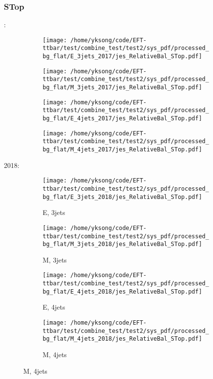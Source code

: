 \documentclass{beamer}
\begin{document}
\begin{frame}
\frametitle{STop}
\fontsize{5}{1}:
\begin{figure}
\centering
\begin{subfigure}[b]{0.24\textwidth}
\texttt{[image: /home/yksong/code/EFT-ttbar/test/combine\_test/test2/sys\_pdf/processed\_bg\_flat/E\_3jets\_2017/jes\_RelativeBal\_STop.pdf]}
\end{subfigure}
\begin{subfigure}[b]{0.24\textwidth}
\texttt{[image: /home/yksong/code/EFT-ttbar/test/combine\_test/test2/sys\_pdf/processed\_bg\_flat/M\_3jets\_2017/jes\_RelativeBal\_STop.pdf]}
\end{subfigure}
\begin{subfigure}[b]{0.24\textwidth}
\texttt{[image: /home/yksong/code/EFT-ttbar/test/combine\_test/test2/sys\_pdf/processed\_bg\_flat/E\_4jets\_2017/jes\_RelativeBal\_STop.pdf]}
\end{subfigure}
\begin{subfigure}[b]{0.24\textwidth}
\texttt{[image: /home/yksong/code/EFT-ttbar/test/combine\_test/test2/sys\_pdf/processed\_bg\_flat/M\_4jets\_2017/jes\_RelativeBal\_STop.pdf]}
\end{subfigure}
\end{figure}
2018:
\begin{figure}
\centering
\begin{subfigure}[b]{0.24\textwidth}
\texttt{[image: /home/yksong/code/EFT-ttbar/test/combine\_test/test2/sys\_pdf/processed\_bg\_flat/E\_3jets\_2018/jes\_RelativeBal\_STop.pdf]}
\captionsetup{font=tiny}
\caption{E, 3jets}
\end{subfigure}
\begin{subfigure}[b]{0.24\textwidth}
\texttt{[image: /home/yksong/code/EFT-ttbar/test/combine\_test/test2/sys\_pdf/processed\_bg\_flat/M\_3jets\_2018/jes\_RelativeBal\_STop.pdf]}
\captionsetup{font=tiny}
\caption{M, 3jets}
\end{subfigure}
\begin{subfigure}[b]{0.24\textwidth}
\texttt{[image: /home/yksong/code/EFT-ttbar/test/combine\_test/test2/sys\_pdf/processed\_bg\_flat/E\_4jets\_2018/jes\_RelativeBal\_STop.pdf]}
\captionsetup{font=tiny}
\caption{E, 4jets}
\end{subfigure}
\begin{subfigure}[b]{0.24\textwidth}
\texttt{[image: /home/yksong/code/EFT-ttbar/test/combine\_test/test2/sys\_pdf/processed\_bg\_flat/M\_4jets\_2018/jes\_RelativeBal\_STop.pdf]}
\captionsetup{font=tiny}
\caption{M, 4jets}
\end{subfigure}
\end{figure}
\end{frame}
\end{document}

